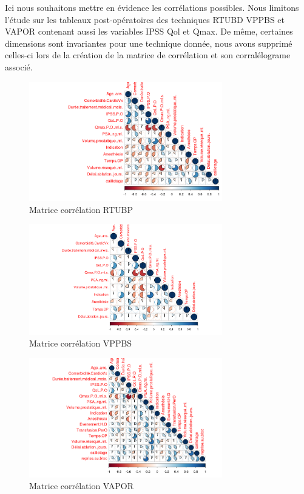 %
%

Ici nous souhaitons mettre en évidence les corrélations possibles.
Nous limitons l’étude sur les tableaux post-opératoires des techniques RTUBD VPPBS et VAPOR contenant 
aussi les variables IPSS Qol et Qmax.
De même, certaines dimensions sont invariantes pour une technique donnée, nous avons supprimé celles-ci lors de la création 
de la matrice de corrélation et son corralélograme associé.

\begin{figure}[H]
\centering
\includegraphics[width=0.75\textwidth]{../Fig/RTUPB/rtupb-corr-matrice-pie}
\caption{Matrice corrélation RTUBP}
\end{figure}

\begin{figure}[H]
\centering
\includegraphics[width=0.75\textwidth]{../Fig/VPPBS/vppbs-corr-matrice-pie}
\caption{Matrice corrélation VPPBS}
\end{figure}

\begin{figure}[H]
\centering
\includegraphics[width=0.75\textwidth]{../Fig/VAPOR/vapor-corr-matrice-pie}
\caption{Matrice corrélation VAPOR}
\end{figure}


